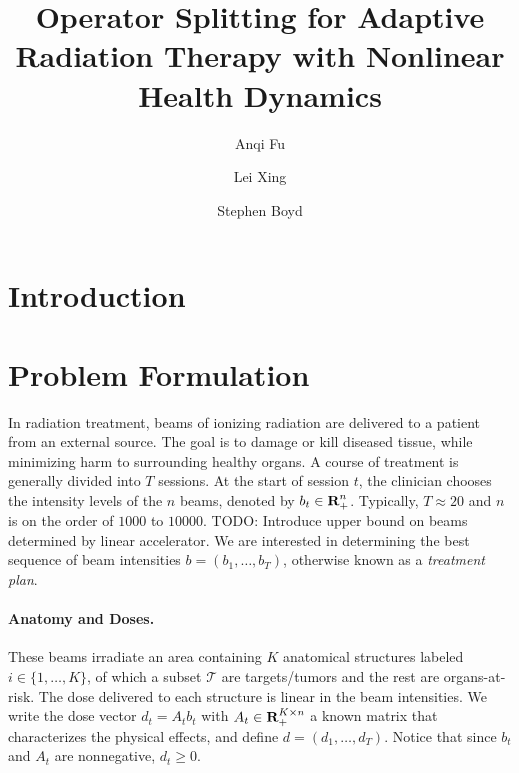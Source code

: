 \documentclass[12pt]{article}
\title{Operator Splitting for Adaptive Radiation Therapy with Nonlinear Health Dynamics}
\author{Anqi Fu \and Lei Xing \and Stephen Boyd}
\begin{document}
\maketitle

\section{Introduction}

\section{Problem Formulation}
\label{sec:prob}
In radiation treatment, beams of ionizing radiation are delivered to a patient from an external source. The goal is to damage or kill diseased tissue, while minimizing harm to surrounding healthy organs. A course of treatment is generally divided into $T$ sessions. At the start of session $t$, the clinician chooses the intensity levels of the $n$ beams, denoted by $b_t \in {\mbox{\bf R}}_+^n$. Typically, $T \approx 20$ and $n$ is on the order of $1000$ to $10000$. TODO: Introduce upper bound on beams determined by linear accelerator. We are interested in determining the best sequence of beam intensities $b = (b_1,\ldots,b_T)$, otherwise known as a {\em treatment plan}.

\paragraph{Anatomy and Doses.} These beams irradiate an area containing $K$ anatomical structures labeled $i \in \{1,\ldots,K\}$, of which a subset $\mathcal{T}$ are targets/tumors and the rest are organs-at-risk. The dose delivered to each structure is linear in the beam intensities. We write the dose vector $d_t = A_tb_t$ with $A_t \in {\mbox{\bf R}}_+^{K \times n}$ a known matrix that characterizes the physical effects, and define $d = (d_1,\ldots,d_T)$. Notice that since $b_t$ and $A_t$ are nonnegative, $d_t \geq 0$.
\end{document}
